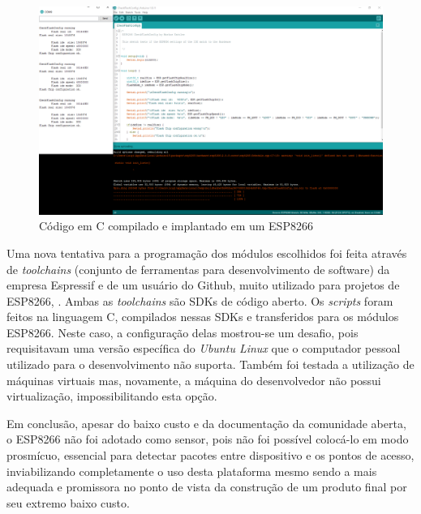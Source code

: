 \begin{figure}[htb]
	\caption{\label{fig:esp-arduino}Código em C compilado e implantado em um ESP8266}
	\begin{center}
		\includegraphics[width=1\textwidth]{040-plataformas/esp-dev/arduino-ide.png}
	\end{center}
\end{figure}


Uma nova tentativa para a programação  dos módulos escolhidos foi feita através de
\emph{toolchains} (conjunto de ferramentas para desenvolvimento de software) da
empresa Espressif e de um usuário do Github, muito utilizado para
projetos de ESP8266, . Ambas as \emph{toolchains}
são SDKs de código aberto. Os \emph{scripts} foram feitos na linguagem C,
compilados nessas SDKs e transferidos para os módulos ESP8266. Neste caso,
a configuração delas mostrou-se um desafio, pois requisitavam uma versão
específica do \emph{Ubuntu Linux} que o computador pessoal utilizado para o desenvolvimento
não suporta. Também foi testada a utilização de máquinas virtuais mas, novamente,
a máquina do desenvolvedor não possui virtualização, impossibilitando esta opção.

Em conclusão, apesar do baixo custo e da documentação da comunidade aberta, o
ESP8266 não foi adotado como sensor, pois não foi possível colocá-lo em modo
prosmícuo, essencial para detectar pacotes entre dispositivo e os pontos de
acesso, inviabilizando completamente o uso desta plataforma mesmo sendo a
mais adequada e promissora no ponto de vista da construção de um produto final
por seu extremo baixo custo.
